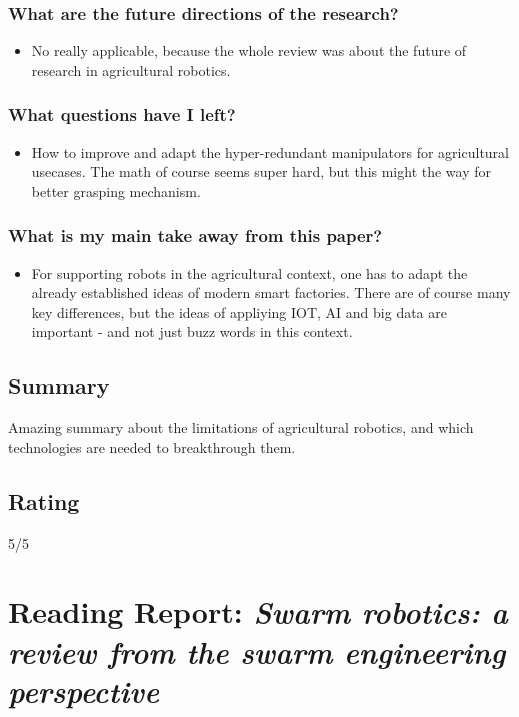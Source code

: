 \documentclass{article}
\begin{document}
\subsubsection*{What are the future directions of the research?}
\begin{itemize}
    \item No really applicable, because the whole review was about the future of research in agricultural robotics.
\end{itemize}
\subsubsection*{What questions have I left?}
\begin{itemize}
    \item How to improve and adapt the hyper-redundant manipulators for agricultural usecases. The math of course seems super hard, but this might the way for better grasping mechanism.
\end{itemize}
\subsubsection*{What is my main take away from this paper?}
\begin{itemize}
    \item For supporting robots in the agricultural context, one has to adapt the already established ideas of modern smart factories. There are of course many key differences, but the ideas of appliying IOT, AI and big data are important  - and not just buzz words in this context.
\end{itemize}

\subsection*{Summary}
Amazing summary about the limitations of agricultural robotics, and which technologies are needed to breakthrough them.

\subsection*{Rating}
5/5


\section{Reading Report: \emph{Swarm robotics: a review from the swarm engineering perspective}}
\cite{Brambilla2013}
\end{document}
